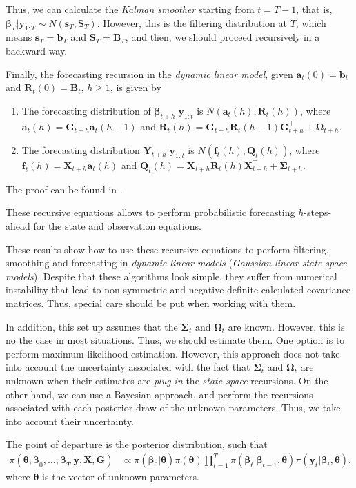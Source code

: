 Thus, we can calculate the \textit{Kalman smoother} starting from $t=T-1$, that is, $\bm{\beta}_{T}|\bm{y}_{1:T}\sim N(\bm{s}_{T},\bm{S}_{T})$. However, this is the filtering distribution at $T$, which means $\bm{s}_{T}=\bm{b}_{T}$ and $\bm{S}_{T}=\bm{B}_{T}$, and then, we should proceed recursively in a backward way.

Finally, the forecasting recursion in the \textit{dynamic linear model}, given $\bm{a}_t(0)=\bm{b}_t$ and $\bm{R}_t(0)=\bm{B}_t$, $h\geq 1$, is given by 
\begin{enumerate}
	\item The forecasting distribution of $\bm{\beta}_{t+h}|\bm{y}_{1:t}$ is $N(\bm{a}_t(h),\bm{R}_t(h))$, where $\bm{a}_t(h)=\bm{G}_{t+h}\bm{a}_{t}(h-1)$ and $\bm{R}_t(h)=\bm{G}_{t+h}\bm{R}_t(h-1)\bm{G}_{t+h}^{\top}+\bm{\Omega}_{t+h}$.
	\item The forecasting distribution $\bm{Y}_{t+h}|\bm{y}_{1:t}$ is $N(\bm{f}_t(h),\bm{Q}_t(h))$, where $\bm{f}_t(h)=\bm{X}_{t+h}\bm{a}_t(h)$ and $\bm{Q}_t(h)=\bm{X}_{t+h}\bm{R}_t(h)\bm{X}_{t+h}^{\top}+\bm{\Sigma}_{t+h}$.  
\end{enumerate}
The proof can be found in \cite[Chap~2]{petris2009dynamic}.

These recursive equations allows to perform probabilistic forecasting $h$-steps-ahead for the state and observation equations.

These results show how to use these recursive equations to perform filtering, smoothing and forecasting in \textit{dynamic linear models} (\textit{Gaussian linear state-space models}). Despite that these algorithms look simple, they suffer from numerical instability that lead to non-symmetric and negative definite calculated covariance matrices. Thus, special care should be put when working with them.

In addition, this set up assumes that the $\bm{\Sigma}_t$ and $\bm{\Omega}_t$ are known. However, this is no the case in most situations. Thus, we should estimate them. One option is to perform maximum likelihood estimation. However, this approach does not take into account the uncertainty associated with the fact that $\bm{\Sigma}_t$ and $\bm{\Omega}_t$ are unknown when their estimates are \textit{plug in} the \textit{state space} recursions. On the other hand, we can use a Bayesian approach, and perform the recursions associated with each posterior draw of the unknown parameters. Thus, we take into account their uncertainty.

The point of departure is the posterior distribution, such that
\begin{align*}
	\pi(\bm{\theta},\bm{\beta}_0,\dots,\bm{\beta}_T|\bm{y}, \bm{X}, \bm{G})&\propto\pi(\bm{\beta}_0|\bm{\theta})\pi(\bm{\theta})\prod_{t=1}^{T}\pi(\bm{\beta}_t|\bm{\beta}_{t-1},\bm{\theta})\pi(\bm{y}_t|\bm{\beta}_t,\bm{\theta}),
\end{align*} 
where $\bm{\theta}$ is the vector of unknown parameters.

